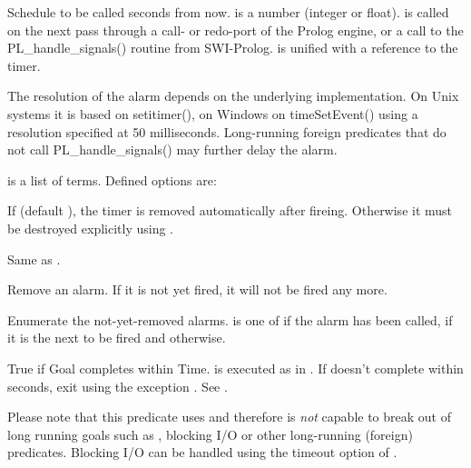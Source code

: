 \documentclass[11pt]{article}
\begin{document}
\begin{description}
Schedule  to be called  seconds from now.
 is a number (integer or float).   is called
on the next pass through a call- or redo-port of the Prolog engine,
or a call to the PL_handle_signals() routine from SWI-Prolog.  
is unified with a reference to the timer.

The resolution of the alarm depends on the underlying implementation. On
Unix systems it is based on setitimer(), on Windows on timeSetEvent()
using a resolution specified at 50 milliseconds. Long-running foreign predicates that do not call
PL_handle_signals() may further delay the alarm.

 is a list of  terms.  Defined 
options are:

\begin{description}
If  (default ), the timer is removed
automatically after fireing. Otherwise it must be destroyed explicitly
using .
\end{description}

Same as .

Remove an alarm.  If it is not yet fired, it will not be fired
any more.

Enumerate the not-yet-removed alarms.   is one of
 if the alarm has been called,  if it
is the next to be fired and  otherwise.

True if Goal completes within Time.  is executed as in .
If  doesn't complete within  seconds, exit using the
exception . See .

Please note that this predicate uses  and therefore is \emph{not}
capable to break out of long running goals such as , blocking I/O
or other long-running (foreign) predicates.  Blocking I/O can be handled
using the timeout option of .
\end{description}
\end{document}
